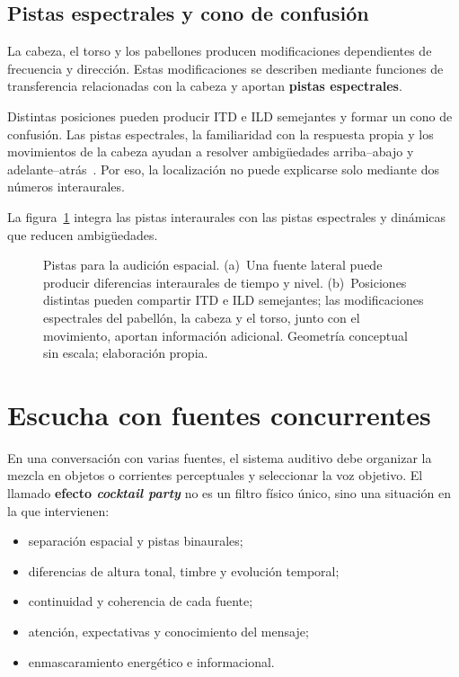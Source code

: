 \subsection{Pistas espectrales y cono de confusión}
\label{sec:u7-pistas-espectrales}

La cabeza, el torso y los pabellones producen modificaciones dependientes de
frecuencia y dirección. Estas modificaciones se describen mediante funciones
de transferencia relacionadas con la cabeza y aportan
\textbf{pistas espectrales}.

Distintas posiciones pueden producir ITD e ILD semejantes y formar un
cono de confusión. Las pistas espectrales, la familiaridad con la respuesta
propia y los movimientos de la cabeza ayudan a resolver ambigüedades
arriba--abajo y adelante--atrás~\cite{carlini2024}. Por eso, la localización no puede explicarse
solo mediante dos números interaurales.

La figura~\ref{fig:u7-localizacion} integra las pistas interaurales con las
pistas espectrales y dinámicas que reducen ambigüedades.

\begin{figure}[htbp]
    \centering
    
    \caption{Pistas para la audición espacial. (a)~Una fuente lateral puede
    producir diferencias interaurales de tiempo y nivel. (b)~Posiciones
    distintas pueden compartir ITD e ILD semejantes; las modificaciones
    espectrales del pabellón, la cabeza y el torso, junto con el movimiento,
    aportan información adicional. Geometría conceptual sin escala;
    elaboración propia.}
    \label{fig:u7-localizacion}
\end{figure}

\section{Escucha con fuentes concurrentes}
\label{sec:u7-cocktail-party}

En una conversación con varias fuentes, el sistema auditivo debe organizar la
mezcla en objetos o corrientes perceptuales y seleccionar la voz objetivo. El
llamado \textbf{efecto \emph{cocktail party}} no es un filtro físico único,
sino una situación en la que intervienen:

\begin{itemize}
    \item separación espacial y pistas binaurales;
    \item diferencias de altura tonal, timbre y evolución temporal;
    \item continuidad y coherencia de cada fuente;
    \item atención, expectativas y conocimiento del mensaje;
    \item enmascaramiento energético e informacional.
\end{itemize}

